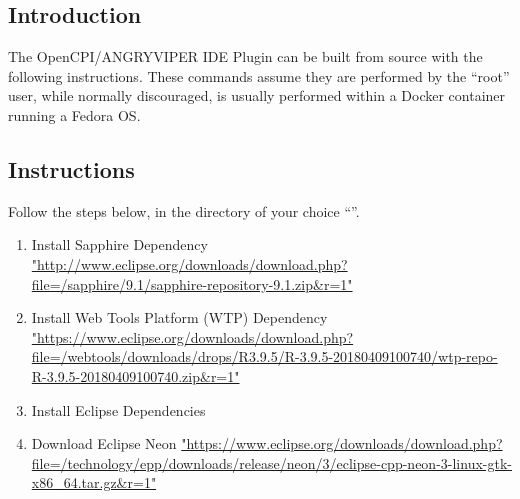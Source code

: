 \documentclass[10pt, a4paper, oneside]{article}
\begin{document}
\begin{appendices}
\subsection{Introduction}
The OpenCPI/ANGRYVIPER IDE Plugin can be built from source with the following instructions. These commands assume they are performed by the ``root'' user, while normally discouraged, is usually performed within a Docker container running a Fedora OS.
\subsection{Instructions}
Follow the steps below, in the directory of your choice ``''. %
\begin{enumerate}
\item Install Sapphire Dependency
\url{"http://www.eclipse.org/downloads/download.php?file=/sapphire/9.1/sapphire-repository-9.1.zip&r=1"}

\item Install Web Tools Platform (WTP) Dependency
\url{"https://www.eclipse.org/downloads/download.php?file=/webtools/downloads/drops/R3.9.5/R-3.9.5-20180409100740/wtp-repo-R-3.9.5-20180409100740.zip&r=1"}

\item Install Eclipse Dependencies

\item Download Eclipse Neon
\url{"https://www.eclipse.org/downloads/download.php?file=/technology/epp/downloads/release/neon/3/eclipse-cpp-neon-3-linux-gtk-x86_64.tar.gz&r=1"}


\end{enumerate}
\end{appendices}
\end{document}

